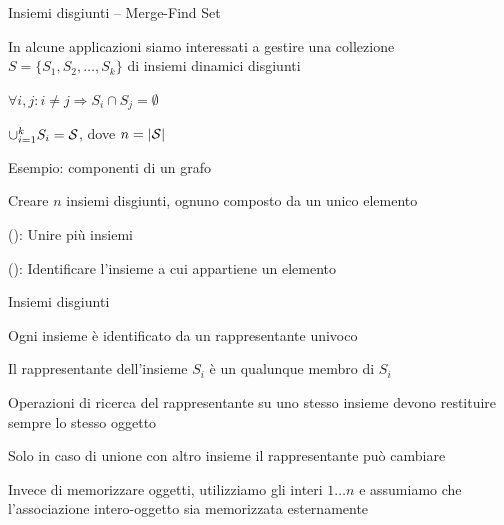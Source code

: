 \begin{frame}{Insiemi disgiunti -- Merge-Find Set}

\vspace{-9pt}
\begin{myboxtitle}[Motivazioni]
\BIL
\item In alcune applicazioni siamo interessati a gestire una collezione 
$S = \{ S_1, S_2, \ldots, S_k \}$ di \alert{insiemi dinamici disgiunti}
  \smallskip
  \BI
  \item $\forall i,j: i \neq j \Rightarrow S_i \cap S_j = \emptyset$
  \item $\cup_{i=1}^k S_i = \cal S$, dove $n = |\cal S|$
  \EI
\item Esempio: componenti di un grafo
\EIL
\end{myboxtitle}

\begin{myboxtitle}
\BIL
\item Creare $n$ insiemi disgiunti, ognuno composto da un unico elemento
\item {}(): Unire più insiemi
\item {}(): Identificare l'insieme a cui appartiene un elemento
\EIL
\end{myboxtitle}

\end{frame}


\begin{frame}{Insiemi disgiunti}

\vspace{-9pt}
\begin{myboxtitle}[Rappresentante]
\BIL
\item Ogni insieme è identificato da un \alert{rappresentante} univoco
\item Il rappresentante  dell'insieme $S_i$  è un qualunque membro di $S_i$
\item Operazioni di ricerca del rappresentante su uno stesso insieme devono restituire sempre lo stesso oggetto
\item Solo in caso di unione con altro insieme il rappresentante può cambiare
\EIL
\end{myboxtitle}

\begin{myboxtitle}[Memorizzazione]
Invece di memorizzare oggetti, utilizziamo gli interi $1 \ldots n$
e assumiamo che l'associazione intero-oggetto sia memorizzata esternamente
\end{myboxtitle}

\end{frame}

